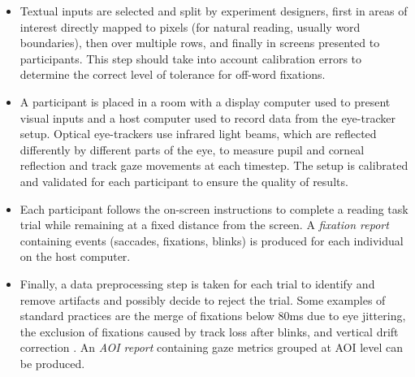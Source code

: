 \documentclass[a4paper, nobind]{templates/ociamthesis}
\begin{document}
\begin{itemize}
\item
  Textual inputs are selected and split by experiment designers, first in areas of interest directly mapped to pixels (for natural reading, usually word boundaries), then over multiple rows, and finally in screens presented to participants. This step should take into account calibration errors to determine the correct level of tolerance for off-word fixations.
\item
  A participant is placed in a room with a display computer used to present visual inputs and a host computer used to record data from the eye-tracker setup. Optical eye-trackers use infrared light beams, which are reflected differently by different parts of the eye, to measure pupil and corneal reflection and track gaze movements at each timestep. The setup is calibrated and validated for each participant to ensure the quality of results.
\item
  Each participant follows the on-screen instructions to complete a reading task trial while remaining at a fixed distance from the screen. A \emph{fixation report} containing events (saccades, fixations, blinks) is produced for each individual on the host computer.
\item
  Finally, a data preprocessing step is taken for each trial to identify and remove artifacts and possibly decide to reject the trial. Some examples of standard practices are the merge of fixations below 80ms due to eye jittering, the exclusion of fixations caused by track loss after blinks, and vertical drift correction \autocite{carr-etal-2020-algorithms}. An \emph{AOI report} containing gaze metrics grouped at AOI level can be produced.
\end{itemize}
\end{document}
